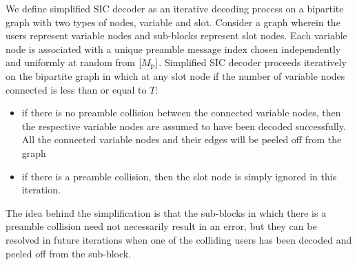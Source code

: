 \begin{definition}
\label{def:simple_SIC}
We define simplified SIC decoder as an iterative decoding process on a bipartite graph with two types of nodes, variable and slot. Consider a graph wherein the users represent variable nodes and sub-blocks represent slot nodes. Each variable node is associated with a unique preamble message index chosen independently and uniformly at random from $[M_{\mathrm{p}}]$. Simplified SIC decoder proceeds iteratively on the bipartite graph in which at any slot node if the number of variable nodes connected is less than or equal to $T$:
\begin{itemize}
\item  if there is no preamble collision between the connected variable nodes, then the respective variable nodes are assumed to have been decoded successfully. All the connected variable nodes and their edges will be peeled off from the graph
\item if there is a preamble collision, then the slot node is simply ignored in this iteration.
\end{itemize}  
\end{definition}
 The idea behind the simplification is that the sub-blocks in which there is a preamble collision need not necessarily result in an error, but they can be resolved in future iterations when one of the colliding users has been decoded and peeled off from the sub-block.


